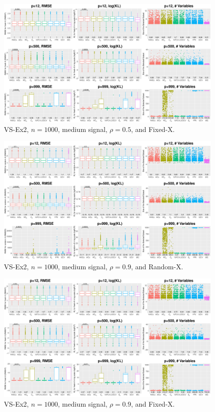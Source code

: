 \begin{figure}[!ht]
\centering
\includegraphics[width=\textwidth]{figures/supplement/fixedx_VS-Ex2_n1000_msnr_rho05.eps}
\caption{VS-Ex2, $n=1000$, medium signal, $\rho=0.5$, and Fixed-X.}
\end{figure}
\clearpage
\begin{figure}[!ht]
\centering
\includegraphics[width=\textwidth]{figures/supplement/randomx_VS-Ex2_n1000_msnr_rho09.eps}
\caption{VS-Ex2, $n=1000$, medium signal, $\rho=0.9$, and Random-X.}
\end{figure}
\begin{figure}[!ht]
\centering
\includegraphics[width=\textwidth]{figures/supplement/fixedx_VS-Ex2_n1000_msnr_rho09.eps}
\caption{VS-Ex2, $n=1000$, medium signal, $\rho=0.9$, and Fixed-X.}
\end{figure}
